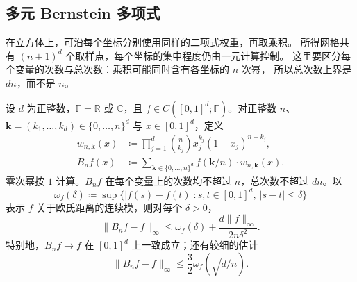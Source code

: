 \subsection{多元 Bernstein 多项式}
\label{b2:subsec:approximation-bernstein-multivariate}

在立方体上，可沿每个坐标分别使用同样的二项式权重，再取乘积。
所得网格共有 \((n+1)^d\) 个取样点，每个坐标的集中程度仍由一元计算控制。
这里要区分每个变量的次数与总次数：乘积可能同时含有各坐标的 \(n\) 次幂，
所以总次数上界是 \(dn\)，而不是 \(n\)。

\begin{theorem}
\label{b2:thm:approximation-bernstein-multivariate}
设 \(d\) 为正整数，\(\mathbb F=\mathbb R\) 或 \(\mathbb C\)，且 \(f\in C([0,1]^d;\mathbb F)\)。对正整数 \(n\)、\(\mathbf k=(k_1,\ldots,k_d)\in\{0,\ldots,n\}^d\) 与 \(x\in[0,1]^d\)，定义
\[
\begin{aligned}
 w_{n,\mathbf k}(x)
 &\coloneqq\prod_{j=1}^d\binom n{k_j}x_j^{k_j}(1-x_j)^{n-k_j},\\
 B_nf(x)
 &\coloneqq\sum_{\mathbf k\in\{0,\ldots,n\}^d}
       f(\mathbf k/n)\cdot w_{n,\mathbf k}(x).
\end{aligned}
\]
零次幂按 \(1\) 计算。\(B_nf\) 在每个变量上的次数均不超过 \(n\)，总次数不超过 \(dn\)。以
\[
 \omega_f(\delta)\coloneqq
 \sup\{|f(s)-f(t)|:s,t\in[0,1]^d,\ |s-t|\leq\delta\}
\]
表示 \(f\) 关于欧氏距离的连续模，则对每个 \(\delta>0\)，
\[
 \lVert B_nf-f\rVert_\infty
 \leq\omega_f(\delta)
       +\frac{d\lVert f\rVert_\infty}{2n\delta^2}.
\]
特别地，\(B_nf\to f\) 在 \([0,1]^d\) 上一致成立；还有较细的估计
\[
 \lVert B_nf-f\rVert_\infty\leq\frac32\omega_f(\sqrt{d/n}).
\]
\end{theorem}
